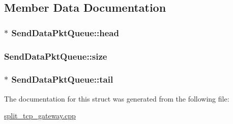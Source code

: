 \subsection{\-Member \-Data \-Documentation}
\hypertarget{structSendDataPktQueue_a746bc373bcb50b940dc9b4a7008734f7}{
\subsubsection[{head}]{$\ast$ {\bf \-Send\-Data\-Pkt\-Queue\-::head}}}\label{structSendDataPktQueue_a746bc373bcb50b940dc9b4a7008734f7}
\hypertarget{structSendDataPktQueue_a38d4786f413d2c08b00db9de7fa6841f}{
\subsubsection[{size}]{ {\bf \-Send\-Data\-Pkt\-Queue\-::size}}}\label{structSendDataPktQueue_a38d4786f413d2c08b00db9de7fa6841f}
\hypertarget{structSendDataPktQueue_add57d3f96d46372714ede0f7f61e9a4f}{
\subsubsection[{tail}]{$\ast$ {\bf \-Send\-Data\-Pkt\-Queue\-::tail}}}\label{structSendDataPktQueue_add57d3f96d46372714ede0f7f61e9a4f}


\-The documentation for this struct was generated from the following file\-:\begin{DoxyCompactItemize}
\item 
\hyperlink{split__tcp__gateway_8cpp}{split\-\_\-tcp\-\_\-gateway.\-cpp}\end{DoxyCompactItemize}
